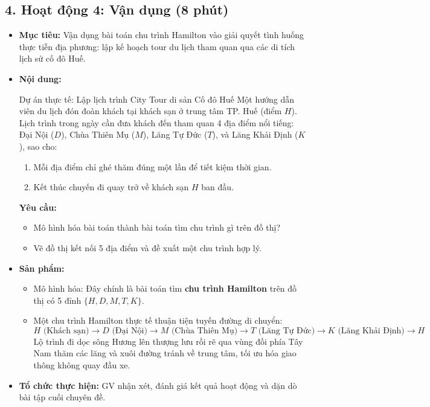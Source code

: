 \documentclass[12pt, a4paper]{article}
\begin{document}
\subsection*{4. Hoạt động 4: Vận dụng (8 phút)}

\begin{itemize}[leftmargin=1.2cm]
    \item[a)] \textbf{Mục tiêu:} Vận dụng bài toán chu trình Hamilton vào giải quyết tình huống thực tiễn địa phương: lập kế hoạch tour du lịch tham quan qua các di tích lịch sử cố đô Huế.
    \item[b)] \textbf{Nội dung:}
    \begin{stembox}{Dự án thực tế: Lập lịch trình City Tour di sản Cố đô Huế}
        Một hướng dẫn viên du lịch đón đoàn khách tại khách sạn ở trung tâm TP. Huế (điểm $H$). Lịch trình trong ngày cần đưa khách đến tham quan 4 địa điểm nổi tiếng: Đại Nội ($D$), Chùa Thiên Mụ ($M$), Lăng Tự Đức ($T$), và Lăng Khải Định ($K$), sao cho:
        \begin{enumerate}[leftmargin=0.6cm]
            \item Mỗi địa điểm chỉ ghé thăm đúng một lần để tiết kiệm thời gian.
            \item Kết thúc chuyến đi quay trở về khách sạn $H$ ban đầu.
        \end{enumerate}
        \textbf{Yêu cầu:}
        \begin{itemize}
            \item Mô hình hóa bài toán thành bài toán tìm chu trình gì trên đồ thị?
            \item Vẽ đồ thị kết nối 5 địa điểm và đề xuất một chu trình hợp lý.
        \end{itemize}
    \end{stembox}
    \item[c)] \textbf{Sản phẩm:}
    \begin{itemize}[leftmargin=0.6cm]
        \item Mô hình hóa: Đây chính là bài toán tìm \textbf{chu trình Hamilton} trên đồ thị có 5 đỉnh $\{H, D, M, T, K\}$.
        \item Một chu trình Hamilton thực tế thuận tiện tuyến đường di chuyển:
        $$H \text{ (Khách sạn)} \to D \text{ (Đại Nội)} \to M \text{ (Chùa Thiên Mụ)} \to T \text{ (Lăng Tự Đức)} \to K \text{ (Lăng Khải Định)} \to H$$
        Lộ trình đi dọc sông Hương lên thượng lưu rồi rẽ qua vùng đồi phía Tây Nam thăm các lăng và xuôi đường tránh về trung tâm, tối ưu hóa giao thông không quay đầu xe.
    \end{itemize}
    \item[d)] \textbf{Tổ chức thực hiện:} GV nhận xét, đánh giá kết quả hoạt động và dặn dò bài tập cuối chuyên đề.
\end{itemize}
\end{document}
